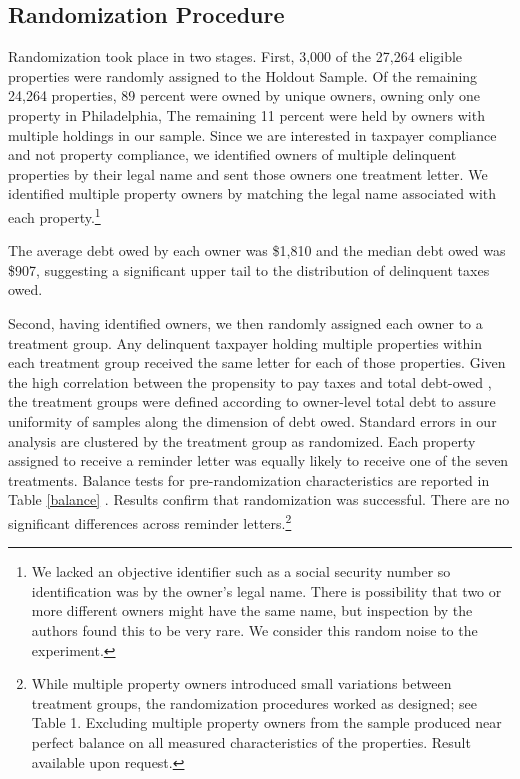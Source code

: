 \documentclass[12pt]{article}
\begin{document}
	
	
\subsection{Randomization Procedure}

Randomization took place in two stages.  First, 3,000 of the 27,264
eligible properties were randomly assigned to the Holdout Sample.  Of
the remaining 24,264 properties, 89 percent were owned by unique
owners, owning only one property in Philadelphia, The remaining 11
percent were held by owners with multiple holdings in our sample.
Since we are interested in taxpayer compliance and not property
compliance, we identified owners of multiple delinquent properties by
their legal name and sent those owners one treatment letter.  We
identified multiple property owners by matching the legal name
associated with each property.\footnote{We lacked an objective
  identifier such as a social security number so identification was by
  the owner's legal name.  There is possibility that two or more
  different owners might have the same name, but inspection by the
  authors found this to be very rare.  We consider this random noise
  to the experiment.}
	
The average debt owed by each owner was \$1,810 and the median debt
owed was \$907, suggesting a significant upper tail to the
distribution of delinquent taxes owed.
	
Second, having identified owners, we then randomly assigned each owner
to a treatment group.  Any delinquent taxpayer holding multiple
properties within each treatment group received the same letter for
each of those properties.  Given the high correlation between the
propensity to pay taxes and total debt-owed , the treatment groups
were defined according to owner-level total debt to assure uniformity
of samples along the dimension of debt owed.  Standard errors in our
analysis are clustered by the treatment group as randomized.  Each
property assigned to receive a reminder letter was equally likely to
receive one of the seven treatments.  Balance tests for
pre-randomization characteristics are reported in Table \ref{balance} .  Results
confirm that randomization was successful.  There are no significant
differences across reminder letters.\footnote{While multiple property
  owners introduced small variations between treatment groups, the
  randomization procedures worked as designed; see Table 1.  Excluding
  multiple property owners from the sample produced near perfect
  balance on all measured characteristics of the properties.  Result
  available upon request.}
	      
\end{document}

